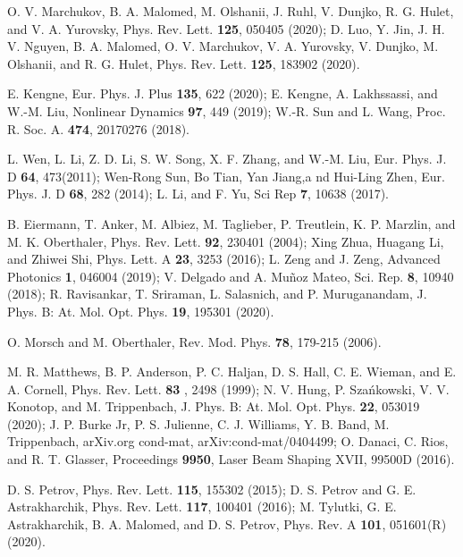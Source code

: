 \documentclass[preprintnumbers]{revtex4}
\begin{document}
\begin{thebibliography}{99}
 O. V. Marchukov, B. A. Malomed, M. Olshanii, J. Ruhl, V.
Dunjko, R. G. Hulet, and V. A. Yurovsky, Phys. Rev. Lett. \textbf{125},
050405 (2020); D. Luo, Y. Jin, J. H. V. Nguyen, B. A. Malomed, O. V.
Marchukov, V. A. Yurovsky, V. Dunjko, M. Olshanii, and R. G. Hulet, Phys.
Rev. Lett. \textbf{125}, 183902 (2020).

 E. Kengne, Eur. Phys. J. Plus \textbf{135}, 622 (2020); E.
Kengne, A. Lakhssassi, and W.-M. Liu, Nonlinear Dynamics \textbf{97}, 449
(2019); W.-R. Sun and L. Wang, Proc. R. Soc. A. \textbf{474}, 20170276
(2018).

 L. Wen, L. Li, Z. D. Li, S. W. Song, X. F. Zhang, and W.-M.
Liu, Eur. Phys. J. D \textbf{64}, 473(2011); Wen-Rong Sun, Bo Tian, Yan
Jiang,a nd Hui-Ling Zhen, Eur. Phys. J. D \textbf{68}, 282 (2014); L. Li,
and F. Yu, Sci Rep \textbf{7}, 10638 (2017).

 B. Eiermann, T. Anker, M. Albiez, M. Taglieber, P. Treutlein,
K. P. Marzlin, and M. K. Oberthaler, Phys. Rev. Lett. \textbf{92}, 230401
(2004); Xing Zhua, Huagang Li, and Zhiwei Shi, Phys. Lett. A \textbf{23},
3253 (2016); L. Zeng and J. Zeng, Advanced Photonics \textbf{1}, 046004
(2019); V. Delgado and A. Mu\~{n}oz Mateo, Sci. Rep. \textbf{8}, 10940
(2018); R. Ravisankar, T. Sriraman, L. Salasnich, and P. Muruganandam, J.
Phys. B: At. Mol. Opt. Phys. \textbf{19}, 195301 (2020).

 O. Morsch and M. Oberthaler, Rev. Mod. Phys. \textbf{78},
179-215 (2006).

 M. R. Matthews, B. P. Anderson, P. C. Haljan, D. S. Hall, C. E.
Wieman, and E. A. Cornell, Phys. Rev. Lett. \textbf{83} , 2498 (1999); N. V.
Hung, P. Sza\'{n}kowski, V. V. Konotop, and M. Trippenbach, J. Phys. B: At.
Mol. Opt. Phys. \textbf{22}, 053019 (2020); J. P. Burke Jr, P. S. Julienne,
C. J. Williams, Y. B. Band, M. Trippenbach, arXiv.org cond-mat,
arXiv:cond-mat/0404499; O. Danaci, C. Rios, and R. T. Glasser, Proceedings
\textbf{9950}, Laser Beam Shaping XVII, 99500D (2016).

 D. S. Petrov, Phys. Rev. Lett. \textbf{115}, 155302 (2015);
D. S. Petrov and G. E. Astrakharchik, Phys. Rev. Lett. \textbf{117}, 100401
(2016); M. Tylutki, G. E. Astrakharchik, B. A. Malomed, and D. S. Petrov,
Phys. Rev. A \textbf{101}, 051601(R) (2020).


\end{thebibliography}
\end{document}
